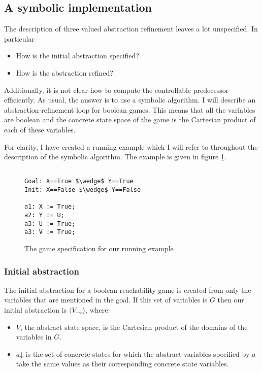 \documentclass[a4paper,twoside,openright,11pt]{book}
\newcommand{\concrete}[1]{#1\mathord{\downarrow}}
\theoremstyle{definition}
\begin{document}
\subsection{A symbolic implementation}

The description of three valued abstraction refinement leaves a lot unspecified. In particular

\begin{itemize}
    \item How is the initial abstraction specified?
    \item How is the abstraction refined?
\end{itemize}

Additionally, it is not clear how to compute the controllable predecessor efficiently. As usual, the answer is to use a symbolic algorithm. I will describe an abstraction-refinement loop for boolean games. This means that all the variables are boolean and the concrete state space of the game is the Cartesian product of each of these variables.

For clarity, I have created a running example which I will refer to throughout the description of the symbolic algorithm. The example is given in figure \ref{fig:running_example}.

\lstset{
    numbers=left,
    frame=single
}

\begin{figure}
    \begin{lstlisting}[mathescape]

Goal: X==True $\wedge$ Y==True
Init: X==False $\wedge$ Y==False

a1: X := True;
a2: Y := U;
a3: U := True;
a3: V := True;

\end{lstlisting}
\caption{The game specification for our running example}
\label{fig:running_example}
\end{figure}

\subsubsection{Initial abstraction}

The initial abstraction for a boolean reachability game is created from only the variables that are mentioned in the goal. If this set of variables is $G$ then our initial abstraction is $\langle V, \concrete{} \rangle$, where:
\begin{itemize}
    \item $V$, the abstract state space, is the Cartesian product of the domains of the variables in $G$.
    \item $\concrete{a}$ is the set of concrete states for which the abstract variables specified by $a$ take the same values as their corresponding concrete state variables.
\end{itemize}
\end{document}
